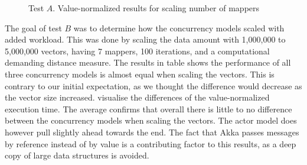 \begin{figure}[h]
\centering
\dataset
{}
\caption{Test $A$. Value-normalized results for scaling number of mappers}\label{fig:value_norm_testa}
\end{figure}
%
The goal of test $B$ was to determine how the concurrency models scaled with added workload. This was done by scaling the data amount with 1,000,000 to 5,000,000 vectors, having 7 mappers, 100 iterations, and a computational demanding distance measure. The results in table  shows the performance of all three concurrency models is almost equal when scaling the vectors. This is contrary to our initial expectation, as we thought the difference would decrease as the vector size increased.  visualise the differences of the value-normalized execution time. The average confirms that overall there is little to no difference between the concurrency models when scaling the vectors. The actor model does however pull slightly ahead towards the end. The fact that Akka passes messages by reference instead of by value is a  contributing factor to this results, as a deep copy of large data structures is avoided. 
